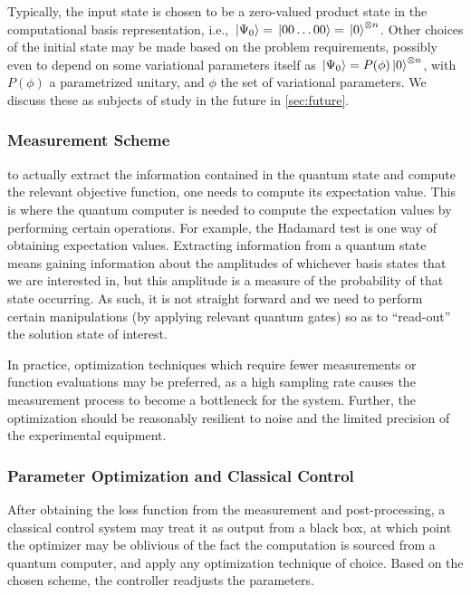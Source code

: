 Typically, the input state is chosen to be a zero-valued product state in the
computational basis representation, i.e., \(\ket*{\Psi_0} = \ket*{00\ldots 00} =
\ket*{0}^{\otimes n}\). Other choices of the initial state may be made based on
the problem requirements, possibly even to depend on some variational parameters
itself as \(\ket*{\Psi_0} = P(\phi) \ket*{0}^{\otimes n}\), with \(P(\phi)\) a
parametrized unitary, and \(\phi\) the set of variational parameters. We discuss
these as subjects of study in the future in \autoref{sec:future}.

\subsubsection{Measurement Scheme}
to actually extract the information contained in the quantum state and compute
the relevant objective function, one needs to compute its expectation value.
This is where the quantum computer is needed to compute the expectation values
by performing certain operations. For example, the Hadamard test is one way of
obtaining expectation values. Extracting information from a quantum state means
gaining information about the amplitudes of whichever basis states that we are
interested in, but this amplitude is a measure of the probability of that state
occurring. As such, it is not straight forward and we need to perform certain
manipulations (by applying relevant quantum gates) so as to ``read-out'' the
solution state of interest.

In practice, optimization techniques which require fewer measurements or
function evaluations may be preferred, as a high sampling rate causes the
measurement process to become a bottleneck for the system. Further, the
optimization should be reasonably resilient to noise and the limited precision
of the experimental equipment.

\subsubsection{Parameter Optimization and Classical Control}

After obtaining the loss function from the measurement and post-processing, a
classical control system may treat it as output from a black box, at which point
the optimizer may be oblivious of the fact the computation is sourced from a
quantum computer, and apply any optimization technique of choice. Based on the
chosen scheme, the controller readjusts the parameters. 

